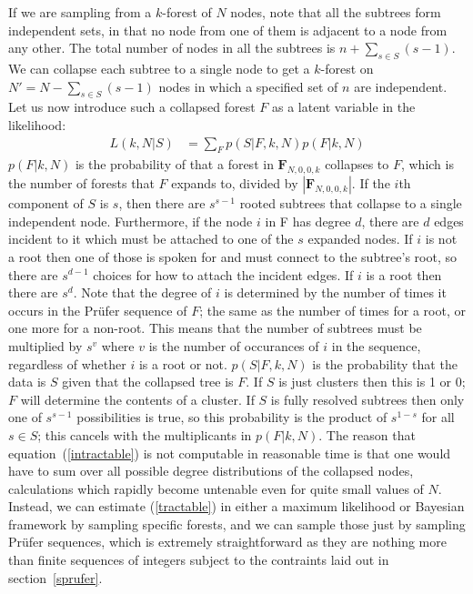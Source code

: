 \documentclass{article}
\newcommand{\fzero}{\mathbf{F}_{N,0,0,k}}
\newcommand{\prufer}{Pr{\"u}fer }
\begin{document}
If we are sampling from a $k$-forest of $N$ nodes, note that all the subtrees form independent sets, in that no node from one of them is adjacent to a node from any other. The total number of nodes in all the subtrees is $n+\sum_{s\in S}(s-1)$. We can collapse each subtree to a single node to get a $k$-forest on $N'=N - \sum_{s\in S}(s-1)$ nodes in which a specified set of $n$ are independent. Let us now introduce such a collapsed forest $F$ as a latent variable in the likelihood:
\begin{align}\label{tractable}
L(k,N|S) &= \sum_F p(S|F,k,N)p(F|k,N)
\end{align}
$p(F|k,N)$ is the probability of that a forest in $\fzero$ collapses to $F$, which is the number of forests that $F$ expands to, divided by $|\fzero|$. If the $i$th component of $S$ is $s$, then there are $s^{s-1}$ rooted subtrees that collapse to a single independent node. Furthermore, if the node $i$ in F has degree $d$, there are $d$ edges incident to it which must be attached to one of the $s$ expanded nodes. If $i$ is not a root then one of those is spoken for and must connect to the subtree's root, so there are $s^{d-1}$ choices for how to attach the incident edges. If $i$ is a root then there are $s^d$. Note that the degree of $i$ is determined by the number of times it occurs in the \prufer sequence of $F$; the same as the number of times for a root, or one more for a non-root. This means that the number of subtrees must be multiplied by $s^v$ where $v$ is the number of occurances of $i$ in the sequence, regardless of whether $i$ is a root or not.
$p(S|F,k,N)$ is the probability that the data is $S$ given that the collapsed tree is $F$. If $S$ is just clusters then this is 1 or 0; $F$ will determine the contents of a cluster. If $S$ is fully resolved subtrees then only one of $s^{s-1}$ possibilities is true, so this probability is the product of $s^{1-s}$ for all $s\in S$; this cancels with the multiplicants in $p(F|k,N)$.
The reason that equation~(\ref{intractable}) is not computable in reasonable time is that one would have to sum over all possible degree distributions of the collapsed nodes, calculations which rapidly become untenable even for quite small values of $N$. Instead, we can estimate (\ref{tractable}) in either a maximum likelihood or Bayesian framework by sampling specific forests, and we can sample those just by sampling \prufer sequences, which is extremely straightforward as they are nothing more than finite sequences of integers subject to the contraints laid out in section~\ref{sprufer}.
\end{document}
